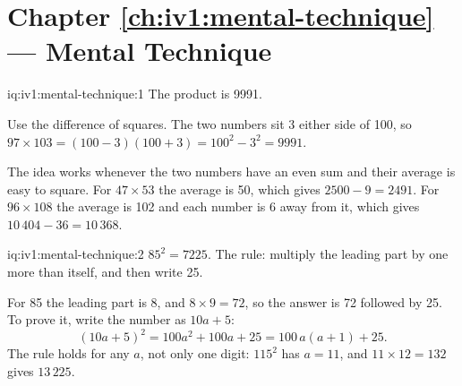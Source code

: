\section*{Chapter \ref{ch:iv1:mental-technique} --- Mental Technique}

\begin{solution}{iq:iv1:mental-technique:1}
The product is 9991.

Use the difference of squares. The two numbers sit 3 either side of 100, so $97 \times 103 = (100 - 3)(100 + 3) = 100^2 - 3^2 = 9991$.

The idea works whenever the two numbers have an even sum and their average is easy to square. For $47 \times 53$ the average is 50, which gives $2500 - 9 = 2491$. For $96 \times 108$ the average is 102 and each number is 6 away from it, which gives $10\,404 - 36 = 10\,368$.

\end{solution}

\begin{solution}{iq:iv1:mental-technique:2}
$85^2 = 7225$. The rule: multiply the leading part by one more than itself, and then write 25.

For 85 the leading part is 8, and $8 \times 9 = 72$, so the answer is 72 followed by 25. To prove it, write the number as $10a + 5$:
\[
(10a + 5)^2 = 100a^2 + 100a + 25 = 100\,a(a + 1) + 25.
\]
The rule holds for any $a$, not only one digit: $115^2$ has $a = 11$, and $11 \times 12 = 132$ gives $13\,225$.

\end{solution}

